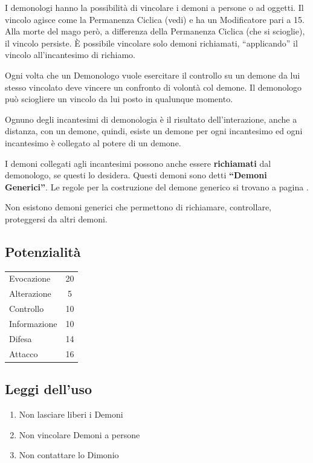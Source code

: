 I demonologi hanno la possibilit\`a di vincolare i demoni a persone
o ad oggetti. Il vincolo agisce come la Permanenza Ciclica (vedi) e ha
un Modificatore pari a 15. Alla morte del mago per\`o, a differenza
della Permanenza Ciclica (che si scioglie), il vincolo persiste. \`E
possibile vincolare solo demoni richiamati, ``applicando'' il vincolo
all'incantesimo di richiamo.

Ogni volta che un Demonologo vuole esercitare il controllo su un
demone da lui stesso vincolato deve vincere un confronto di
volont\`a col demone. Il demonologo pu\`o sciogliere un vincolo da
lui posto in qualunque momento.

Ognuno degli incantesimi di demonologia \`e il risultato
dell'interazione, anche a distanza, con un demone, quindi, esiste un
demone per ogni incantesimo ed ogni incantesimo \`e collegato al
potere di un demone. 

\label{incantesimidemoni}

I demoni collegati agli incantesimi possono anche essere
\textbf{richiamati} dal demonologo, se questi lo desidera. Questi
demoni sono detti \textbf{``Demoni Generici''}. Le regole per la
costruzione del demone generico si trovano a pagina
\pageref{demonigenerici}.

Non esistono demoni generici che
permettono di richiamare, controllare, proteggersi da altri demoni.


\subsection{Potenzialit\`a}
\begin{tabular}{lc}
  Evocazione& 20 \\
  Alterazione& 5 \\
  Controllo& 10 \\
  Informazione& 10\\ 
  Difesa& 14\\
  Attacco& 16 \\
\end{tabular}

\subsection{Leggi dell'uso} 
\begin{enumerate}\itemsep -6pt
\item Non lasciare liberi i Demoni 
\item Non vincolare Demoni a persone 
\item Non contattare lo Dimonio 
\end{enumerate}


